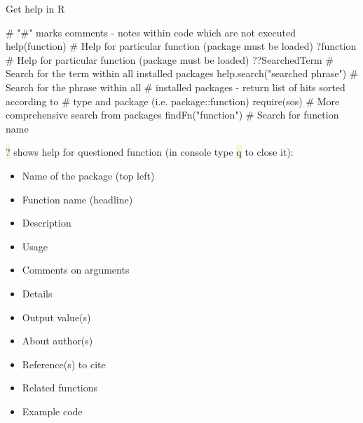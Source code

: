 \documentclass[compress, ucs, xelatex, 11pt, xcolor=svgnames, aspectratio=169,
	hyperref={
		bookmarks=true,
		unicode=true,
		colorlinks=true,
		pdftitle={Molecular data in R},
		plainpages=false,
		pdfauthor={Vojtech Zeisek},
		pdfsubject={Course about phylogeny and evolution in R},
		pdfcreator={XeLaTeX},
		pdfkeywords={R, evolution, phylogeny, molecular data},
		linkcolor=Crimson, %
		anchorcolor=Magenta, %
		citecolor=Magenta, %
		filecolor=Magenta, %
		menucolor=Magenta, %
		urlcolor=DodgerBlue, %
		pdftex},
	url={hyphens, lowtilde} %
	]{beamer}
\renewcommand{\texttt}[1]{\colorbox{Beige}{{\ttfamily #1}}}
\begin{document}
\begin{frame}[fragile]{Get help in R}
	\begin{spluscode}
    # "#" marks comments - notes within code which are not executed
    help(function) # Help for particular function (package must be loaded)
    ?function # Help for particular function (package must be loaded)
    ??SearchedTerm # Search for the term within all installed packages
    help.search("searched phrase") # Search for the phrase within all
      # installed packages - return list of hits sorted according to
      # type and package (i.e. package::function)
    require(sos) # More comprehensive search from packages
    findFn("function") # Search for function name
	\end{spluscode}
	\vfill
	\alert{\texttt{?}} shows help for questioned function (in console type \texttt{q} to close it):
	\vfill
	\begin{multicols}{3}
		\begin{itemize}
			\item Name of the package (top left)
			\item Function name (headline)
			\item Description
			\item Usage
			\item Comments on arguments
			\item Details
			\item Output value(s)
			\item About author(s)
			\item Reference(s) to cite
			\item Related functions
			\item Example code
		\end{itemize}
	\end{multicols}
	\vfill
\end{frame}
\end{document}
